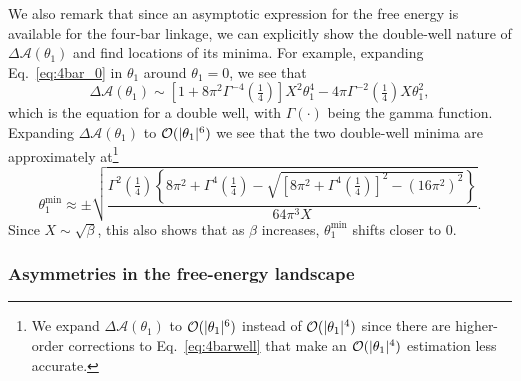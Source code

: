 We also remark that since an asymptotic expression for the free energy is available for the four-bar linkage, we can explicitly show the double-well nature of $\Delta\mathscr{A}(\theta_{1})$ and find locations of its minima.
For example, expanding Eq.~\eqref{eq:4bar_0} in $\theta_{1}$ around $\theta_{1} = 0$, we see that
%
\begin{equation}
  \Delta\mathscr{A}(\theta_{1}) \sim \left[1 + 8\pi^{2}\Gamma^{-4}\left(\tfrac{1}{4}\right)\right]X^{2}\theta_{1}^{4} - 4\pi\Gamma^{-2}\left(\tfrac{1}{4}\right)X\theta_{1}^{2},\label{eq:4barwell}
\end{equation}
%
which is the equation for a double well, with $\Gamma(\cdot)$ being the gamma function.
Expanding $\Delta\mathscr{A}(\theta_{1})$ to $\mathcal{O}(\lvert\theta_{1}\rvert^{6})$ we see that the two double-well minima are approximately at\footnote{We expand $\Delta\mathscr{A}(\theta_{1})$ to $\mathcal{O}(\lvert\theta_{1}\rvert^{6})$ instead of $\mathcal{O}(\lvert\theta_{1}\rvert^{4})$ since there are higher-order corrections to Eq.~\eqref{eq:4barwell} that make an $\mathcal{O}(\lvert\theta_{1}\rvert^{4})$ estimation less accurate.}
%
\begin{equation}
  \theta_{1}^{\text{min}} \approx \pm \sqrt{\frac{\Gamma^{2}\left(\tfrac{1}{4}\right)\left\{8\pi^{2} + \Gamma^{4}\left(\tfrac{1}{4}\right) - \sqrt{\left[8\pi^{2} + \Gamma^{4}\left(\tfrac{1}{4}\right)\right]^{2} - (16\pi^{2})^{2}}\right\}}{64\pi^{3}X}}.
  \label{eq:thetamin}
\end{equation}
%
Since $X \sim \sqrt{\beta}$, this also shows that as $\beta$ increases, $\theta_{1}^{\text{min}}$ shifts closer to $0$.

\subsubsection*{Asymmetries in the free-energy landscape}

